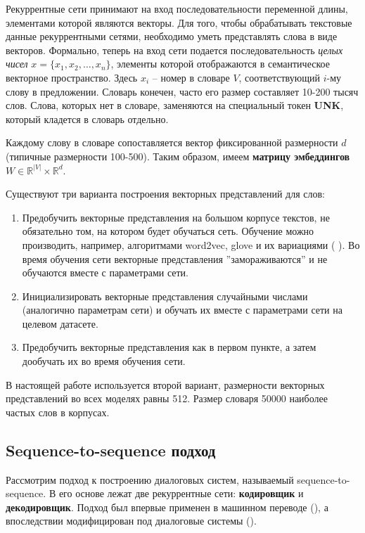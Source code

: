 \documentclass[12pt,a4paper]{amsart}
\begin{document}
Рекуррентные сети принимают на вход последовательности переменной длины, элементами которой являются векторы. Для того, чтобы обрабатывать текстовые данные рекуррентными сетями, необходимо уметь представлять слова в виде векторов. Формально, теперь на вход сети подается последовательность \textit{целых чисел} $x = \lbrace x_1, x_2, \dots, x_n \rbrace$, элементы которой отображаются в семантическое векторное пространство. Здесь $x_i$ -- номер в словаре $V$, соответствующий $i$-му слову в предложении. Словарь конечен, часто его размер составляет 10-200 тысяч слов. Слова, которых нет в словаре, заменяются на специальный токен \textbf{UNK}, который кладется в словарь отдельно.

Каждому слову в словаре сопоставляется вектор фиксированной размерности $d$ (типичные размерности 100-500). Таким образом, имеем \textbf{матрицу эмбеддингов} $W \in \mathbb{R}^{|V|} \times \mathbb{R}^d$.

Существуют три варианта построения векторных представлений для слов:

\begin{enumerate}
	\item Предобучить векторные представления на большом корпусе текстов, не обязательно том, на котором будет обучаться сеть. Обучение можно производить, например, алгоритмами word2vec, glove и их вариациями (\cite{DBLP:journals/corr/MikolovSCCD13} \cite{DBLP:journals/corr/abs-1301-3781} \cite{huang2012improving}). Во время обучения сети векторные представления ''замораживаются'' и не обучаются вместе с параметрами сети.
	\item Инициализировать векторные представления случайными числами (аналогично параметрам сети) и обучать их вместе с параметрами сети на целевом датасете.
	\item Предобучить векторные представления как в первом пункте, а затем дообучать их во время обучения сети.
\end{enumerate}

В настоящей работе используется второй вариант, размерности векторных представлений во всех моделях равны 512. Размер словаря 50000 наиболее частых слов в корпусах.

\subsection{Sequence-to-sequence подход}

Рассмотрим подход к построению диалоговых систем, называемый sequence-to-sequence. В его основе лежат две рекуррентные сети: \textbf{кодировщик} и \textbf{декодировщик}. Подход был впервые применен в машинном переводе (\cite{DBLP:journals/corr/BahdanauCB14}), а впоследствии модифицирован под диалоговые системы (\cite{DBLP:journals/corr/VinyalsL15}).
\end{document}
